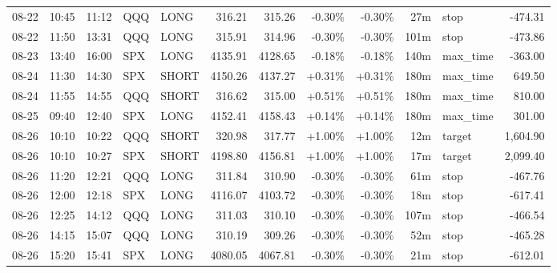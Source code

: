 \documentclass[11pt,a4paper]{article}
\begin{document}
\begin{center}
\begin{longtable}{>{\color{txtmain}}l l l l l r r r r r >{\color{txtmain}}l r}
08-22 & 10:45 & 11:12 & QQQ & LONG & 316.21 & 315.26 & \textcolor{lossred}{-0.30\%} & \textcolor{lossred}{-0.30\%} & 27m & stop & \textcolor{lossred}{-474.31} \\
08-22 & 11:50 & 13:31 & QQQ & LONG & 315.91 & 314.96 & \textcolor{lossred}{-0.30\%} & \textcolor{lossred}{-0.30\%} & 101m & stop & \textcolor{lossred}{-473.86} \\
08-23 & 13:40 & 16:00 & SPX & LONG & 4135.91 & 4128.65 & \textcolor{lossred}{-0.18\%} & \textcolor{lossred}{-0.18\%} & 140m & max\_time & \textcolor{lossred}{-363.00} \\
08-24 & 11:30 & 14:30 & SPX & SHORT & 4150.26 & 4137.27 & \textcolor{wingreen}{+0.31\%} & \textcolor{wingreen}{+0.31\%} & 180m & max\_time & \textcolor{wingreen}{649.50} \\
08-24 & 11:55 & 14:55 & QQQ & SHORT & 316.62 & 315.00 & \textcolor{wingreen}{+0.51\%} & \textcolor{wingreen}{+0.51\%} & 180m & max\_time & \textcolor{wingreen}{810.00} \\
08-25 & 09:40 & 12:40 & SPX & LONG & 4152.41 & 4158.43 & \textcolor{wingreen}{+0.14\%} & \textcolor{wingreen}{+0.14\%} & 180m & max\_time & \textcolor{wingreen}{301.00} \\
08-26 & 10:10 & 10:22 & QQQ & SHORT & 320.98 & 317.77 & \textcolor{wingreen}{+1.00\%} & \textcolor{wingreen}{+1.00\%} & 12m & target & \textcolor{wingreen}{1,604.90} \\
08-26 & 10:10 & 10:27 & SPX & SHORT & 4198.80 & 4156.81 & \textcolor{wingreen}{+1.00\%} & \textcolor{wingreen}{+1.00\%} & 17m & target & \textcolor{wingreen}{2,099.40} \\
08-26 & 11:20 & 12:21 & QQQ & LONG & 311.84 & 310.90 & \textcolor{lossred}{-0.30\%} & \textcolor{lossred}{-0.30\%} & 61m & stop & \textcolor{lossred}{-467.76} \\
08-26 & 12:00 & 12:18 & SPX & LONG & 4116.07 & 4103.72 & \textcolor{lossred}{-0.30\%} & \textcolor{lossred}{-0.30\%} & 18m & stop & \textcolor{lossred}{-617.41} \\
08-26 & 12:25 & 14:12 & QQQ & LONG & 311.03 & 310.10 & \textcolor{lossred}{-0.30\%} & \textcolor{lossred}{-0.30\%} & 107m & stop & \textcolor{lossred}{-466.54} \\
08-26 & 14:15 & 15:07 & QQQ & LONG & 310.19 & 309.26 & \textcolor{lossred}{-0.30\%} & \textcolor{lossred}{-0.30\%} & 52m & stop & \textcolor{lossred}{-465.28} \\
08-26 & 15:20 & 15:41 & SPX & LONG & 4080.05 & 4067.81 & \textcolor{lossred}{-0.30\%} & \textcolor{lossred}{-0.30\%} & 21m & stop & \textcolor{lossred}{-612.01} \\

\end{longtable}
\end{center}
\end{document}
